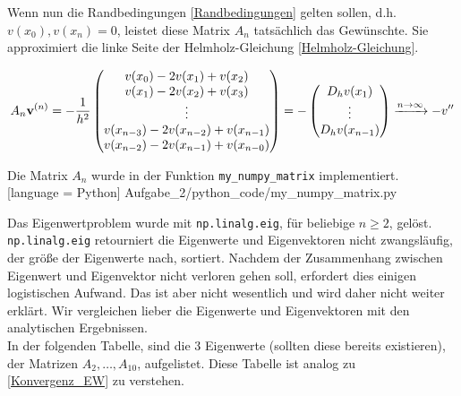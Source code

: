 Wenn nun die Randbedingungen \eqref{Randbedingungen} gelten sollen, d.h. $v(x_0), v(x_n) = 0$, leistet diese Matrix $A_n$ tatsächlich das Gewünschte. Sie approximiert die linke Seite der Helmholz-Gleichung \eqref{Helmholz-Gleichung}.

\begin{align*}
  A_n \mathbf{v}^{(n)} =
  -\frac{1}{h^2}
  \begin{pmatrix}
    v(x_0) - 2 v(x_1) + v(x_2)             \\
    v(x_1) - 2 v(x_2) + v(x_3)             \\
    \vdots                                 \\
    v(x_{n-3}) - 2 v(x_{n-2}) + v(x_{n-1}) \\
    v(x_{n-2}) - 2 v(x_{n-1}) + v(x_{n-0})
  \end{pmatrix} =
  -\begin{pmatrix}
    D_h v(x_1) \\
    \vdots     \\
    D_h v(x_{n-1})
  \end{pmatrix}
  \xrightarrow{n \to \infty}
  -v^{\prime \prime}
\end{align*}

Die Matrix $A_n$ wurde in der Funktion \verb|my_numpy_matrix| implementiert. \\


[language = Python]
{Aufgabe_2/python_code/my_numpy_matrix.py}
\vspace{10pt}

Das Eigenwertproblem wurde mit \verb|np.linalg.eig|, für beliebige $n \geq 2$, gelöst. \verb|np.linalg.eig| retourniert die Eigenwerte und Eigenvektoren nicht zwangsläufig, der größe der Eigenwerte nach, sortiert. Nachdem der Zusammenhang zwischen Eigenwert und Eigenvektor nicht verloren gehen soll, erfordert dies einigen logistischen Aufwand. Das ist aber nicht wesentlich und wird daher nicht weiter erklärt. Wir vergleichen lieber die Eigenwerte und Eigenvektoren mit den analytischen Ergebnissen. \\

In der folgenden Tabelle, sind die $3$ Eigenwerte (sollten diese bereits existieren), der Matrizen $A_2, \ldots, A_{10}$, aufgelistet. Diese Tabelle ist analog zu \eqref{Konvergenz_EW} zu verstehen. \\


\vspace{10pt}

